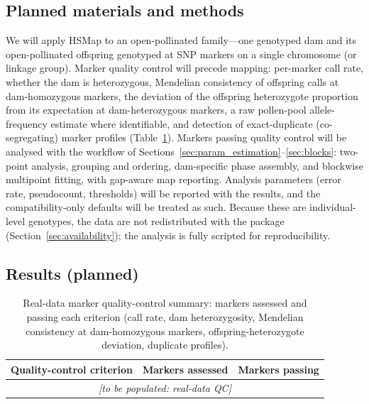 \documentclass[11pt]{article}
\begin{document}
\subsection{Planned materials and methods}
We will apply \textsf{HSMap} to an open-pollinated family---one genotyped dam and its
open-pollinated offspring genotyped at SNP markers on a single chromosome (or linkage
group). Marker quality control will precede mapping: per-marker call rate, whether the
dam is heterozygous, Mendelian consistency of offspring calls at dam-homozygous markers,
the deviation of the offspring heterozygote proportion from its expectation at
dam-heterozygous markers, a raw pollen-pool allele-frequency estimate where identifiable,
and detection of exact-duplicate (co-segregating) marker profiles
(Table~\ref{tab:qc}). Markers passing quality control will be analysed with the workflow
of Sections~\ref{sec:param_estimation}--\ref{sec:blocks}: two-point analysis, grouping
and ordering, dam-specific phase assembly, and blockwise multipoint fitting, with
gap-aware map reporting. Analysis parameters (error rate, pseudocount, thresholds) will
be reported with the results, and the compatibility-only defaults will be treated as
such. Because these are individual-level genotypes, the data are not redistributed with
the package (Section~\ref{sec:availability}); the analysis is fully scripted for
reproducibility.

\subsection{Results (planned)}

\begin{table}[t]
\centering
\caption{Real-data marker quality-control summary: markers assessed and passing each
criterion (call rate, dam heterozygosity, Mendelian consistency at dam-homozygous
markers, offspring-heterozygote deviation, duplicate profiles).}
\label{tab:qc}
\begin{tabular}{lcc}
\toprule
Quality-control criterion & Markers assessed & Markers passing \\
\midrule
\multicolumn{3}{c}{\emph{[to be populated: real-data QC]}} \\
\bottomrule
\end{tabular}
\end{table}
\end{document}
